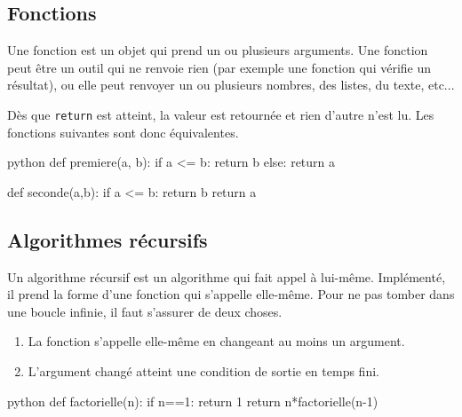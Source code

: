 %

\subsection{Fonctions}

Une fonction est un objet qui prend un ou plusieurs arguments.
Une fonction peut être un outil qui ne renvoie rien (par exemple une fonction qui vérifie un résultat), ou elle peut renvoyer un ou plusieurs nombres, des listes, du texte, etc...

Dès que \texttt{return} est atteint, la valeur est retournée et rien d'autre n'est lu.
Les fonctions suivantes sont donc équivalentes.

\begin{mintedbox}{python}
def premiere(a, b):
	if a <= b:
		return b
	else:
		return a
		
def seconde(a,b):
	if a <= b:
		return b
	return a
\end{mintedbox}

\subsection{Algorithmes récursifs}

Un algorithme récursif est un algorithme qui fait appel à lui-même.
Implémenté, il prend la forme d'une fonction qui s'appelle elle-même.
Pour ne pas tomber dans une boucle infinie, il faut s'assurer de deux choses.
	\begin{enumerate}
		\item La fonction s'appelle elle-même en changeant au moins un argument.
		\item L'argument changé atteint une condition de sortie en temps fini.
	\end{enumerate}

\begin{mintedbox}{python}
def factorielle(n):
	if n==1:
		return 1
	return n*factorielle(n-1)
\end{mintedbox}

